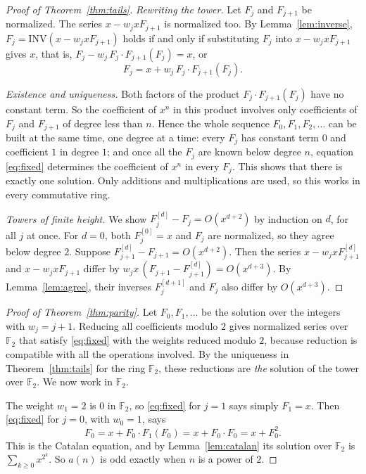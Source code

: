 \documentclass[11pt,a4paper]{article}
\theoremstyle{definition}
\theoremstyle{remark}
\newcommand{\F}{\mathbb{F}}
\begin{document}
\begin{proof}[Proof of Theorem~\ref{thm:tails}]
\emph{Rewriting the tower.} Let $F_j$ and $F_{j+1}$ be normalized. The series $x-w_jxF_{j+1}$ is normalized too. By
Lemma~\ref{lem:inverse}, $F_j=\mathrm{INV}(x-w_jxF_{j+1})$ holds if and only if substituting $F_j$ into
$x-w_jxF_{j+1}$ gives $x$, that is, $F_j-w_j\,F_j\cdot F_{j+1}(F_j)=x$, or
\begin{equation}\label{eq:fixed}
F_j=x+w_j\,F_j\cdot F_{j+1}(F_j).
\end{equation}

\emph{Existence and uniqueness.} Both factors of the product $F_j\cdot F_{j+1}(F_j)$ have no constant term. So the
coefficient of $x^n$ in this product involves only coefficients of $F_j$ and $F_{j+1}$ of degree less than $n$. Hence
the whole sequence $F_0,F_1,F_2,\dots$ can be built at the same time, one degree at a time: every $F_j$ has constant term
$0$ and coefficient $1$ in degree $1$; and once all the $F_j$ are known below degree $n$, equation \eqref{eq:fixed}
determines the coefficient of $x^n$ in every $F_j$. This shows that there is exactly one solution. Only additions and
multiplications are used, so this works in every commutative ring.

\emph{Towers of finite height.} We show $F^{[d]}_j-F_j=O(x^{d+2})$ by induction on $d$, for all $j$ at once. For $d=0$,
both $F^{[0]}_j=x$ and $F_j$ are normalized, so they agree below degree $2$. Suppose $F^{[d]}_{j+1}-F_{j+1}=O(x^{d+2})$.
Then the series $x-w_jxF^{[d]}_{j+1}$ and $x-w_jxF_{j+1}$ differ by $w_jx\,(F_{j+1}-F^{[d]}_{j+1})=O(x^{d+3})$. By
Lemma~\ref{lem:agree}, their inverses $F^{[d+1]}_j$ and $F_j$ also differ by $O(x^{d+3})$.
\end{proof}

\begin{proof}[Proof of Theorem~\ref{thm:parity}]
Let $F_0,F_1,\dots$ be the solution over the integers with $w_j=j+1$. Reducing all coefficients modulo $2$ gives
normalized series over $\F_2$ that satisfy \eqref{eq:fixed} with the weights reduced modulo $2$, because reduction is
compatible with all the operations involved. By the uniqueness in Theorem~\ref{thm:tails} for the ring $\F_2$, these
reductions are \emph{the} solution of the tower over $\F_2$. We now work in $\F_2$.

The weight $w_1=2$ is $0$ in $\F_2$, so \eqref{eq:fixed} for $j=1$ says simply $F_1=x$. Then \eqref{eq:fixed} for $j=0$,
with $w_0=1$, says
\[
F_0=x+F_0\cdot F_1(F_0)=x+F_0\cdot F_0=x+F_0^2 .
\]
This is the Catalan equation, and by Lemma~\ref{lem:catalan} its solution over $\F_2$ is $\sum_{k\ge0}x^{2^k}$. So
$a(n)$ is odd exactly when $n$ is a power of $2$.
\end{proof}
\end{document}
